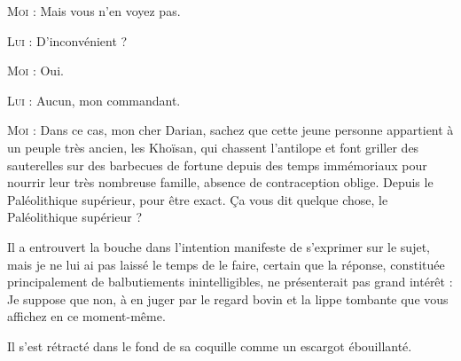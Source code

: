 \begin{dialogue}
\textsc{Moi} : Mais vous n’en voyez pas.

\textsc{Lui} : D’inconvénient ?

\textsc{Moi} : Oui.

\textsc{Lui} : Aucun, mon commandant.

\textsc{Moi} : Dans ce cas, mon cher Darian, sachez que cette jeune personne appartient à un peuple très ancien, les Khoïsan, qui chassent l’antilope et font griller des sauterelles sur des barbecues de fortune depuis des temps immémoriaux pour nourrir leur très nombreuse famille, absence de contraception oblige. Depuis le Paléolithique supérieur, pour être exact. Ça vous dit quelque chose, le Paléolithique supérieur ?

Il a entrouvert la bouche dans l’intention manifeste de s’exprimer sur le sujet, mais je ne lui ai pas laissé le temps de le faire, certain que la réponse, constituée principalement de balbutiements inintelligibles, ne présenterait pas grand intérêt : Je suppose que non, à en juger par le regard bovin et la lippe tombante que vous affichez en ce moment-même.

\end{dialogue}

\noindent Il s’est rétracté dans le fond de sa coquille comme un es\-car\-got ébouillanté.

